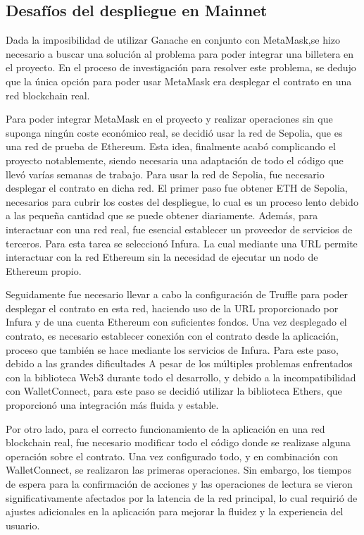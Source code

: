 \subsection{Desafíos del despliegue en Mainnet}

Dada la imposibilidad de utilizar Ganache en conjunto con MetaMask,se hizo necesario a buscar una solución al problema para poder integrar una billetera en el proyecto.
En el proceso de investigación para resolver este problema, se dedujo que la única opción para poder usar MetaMask era desplegar el contrato en una red blockchain real.

Para poder integrar MetaMask en el proyecto y realizar operaciones sin que suponga ningún coste económico real, se decidió usar la red de Sepolia, que es una red de prueba de Ethereum. 
Esta idea, finalmente acabó complicando el proyecto notablemente, siendo necesaria una adaptación de todo el código que llevó varías semanas de trabajo.
Para usar la red de Sepolia, fue necesario desplegar el contrato en dicha red. El primer paso fue obtener ETH de Sepolia, necesarios para cubrir los costes del despliegue, lo cual es un proceso lento debido a las pequeña cantidad que se puede obtener diariamente. 
Además, para interactuar con una red real, fue esencial establecer un proveedor de servicios de terceros. Para esta tarea se seleccionó Infura. La cual mediante una URL permite interactuar con la red Ethereum sin la necesidad de ejecutar un nodo de Ethereum propio. 

Seguidamente fue necesario llevar a cabo la configuración de Truffle para poder desplegar el contrato en esta red, haciendo uso de la URL proporcionado por Infura y de una cuenta Ethereum con suficientes fondos.
Una vez desplegado el contrato, es necesario establecer conexión con el contrato desde la aplicación, proceso que también se hace mediante los servicios de Infura.
Para este paso, debido a las grandes dificultades 
A pesar de los múltiples problemas enfrentados con la biblioteca Web3 durante todo el desarrollo, y debido a la incompatibilidad con WalletConnect, para este paso se decidió utilizar la biblioteca Ethers, que proporcionó una integración más fluida y estable.

Por otro lado, para el correcto funcionamiento de la aplicación en una red blockchain real, fue necesario modificar todo el código donde se realizase alguna operación sobre el contrato.
Una vez configurado todo, y en combinación con WalletConnect, se realizaron las primeras operaciones. Sin embargo, los tiempos de espera para la confirmación de acciones y las operaciones de lectura se vieron significativamente afectados por la latencia de la red principal, lo cual requirió de ajustes adicionales en la aplicación para mejorar la fluidez y la experiencia del usuario.

